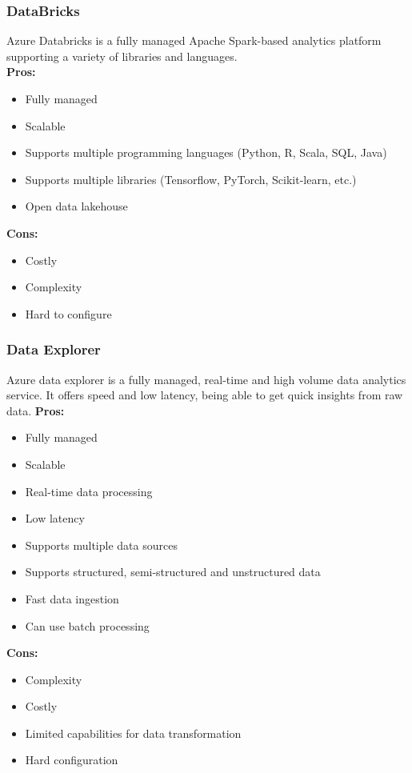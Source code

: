         \subsubsection{DataBricks}
        \label{azure:databricks}
        Azure Databricks is a fully managed Apache Spark-based analytics platform supporting a variety of libraries and languages.\\
        \textbf{Pros:}
        \begin{itemize}
            \item Fully managed
            \item Scalable
            \item Supports multiple programming languages (Python, R, Scala, SQL, Java)
            \item Supports multiple libraries (Tensorflow, PyTorch, Scikit-learn, etc.)
            \item Open data lakehouse
        \end{itemize}
        \textbf{Cons:}
        \begin{itemize}
            \item Costly
            \item Complexity
            \item Hard to configure
        \end{itemize}

        \subsubsection{Data Explorer}
        \label{azure:data-explorer}
        Azure data explorer is a fully managed, real-time and high volume data analytics service. 
        It offers speed and low latency, being able to get quick insights from raw data.
        \textbf{Pros:}
        \begin{itemize}
            \item Fully managed
            \item Scalable
            \item Real-time data processing
            \item Low latency
            \item Supports multiple data sources
            \item Supports structured, semi-structured and unstructured data
            \item Fast data ingestion
            \item Can use batch processing
        \end{itemize}
        \textbf{Cons:}
        \begin{itemize}
            \item Complexity
            \item Costly
            \item Limited capabilities for data transformation
            \item Hard configuration
        \end{itemize}

